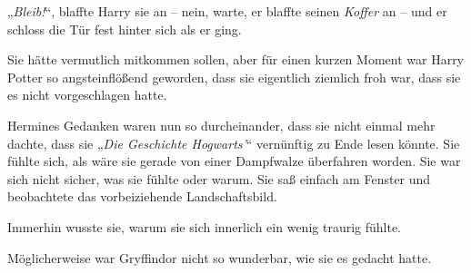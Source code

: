 „\emph{Bleib!}“, blaffte Harry sie an – nein, warte, er blaffte seinen \emph{Koffer} an – und er schloss die Tür fest hinter sich als er ging.

Sie hätte vermutlich mitkommen sollen, aber für einen kurzen Moment war Harry Potter so angsteinflößend geworden, dass sie eigentlich ziemlich froh war, dass sie es nicht vorgeschlagen hatte.

Hermines Gedanken waren nun so durcheinander, dass sie nicht einmal mehr dachte, dass sie „\emph{Die Geschichte Hogwarts’}“ vernünftig zu Ende lesen könnte. Sie fühlte sich, als wäre sie gerade von einer Dampfwalze überfahren worden. Sie war sich nicht sicher, was sie fühlte oder warum. Sie saß einfach am Fenster und beobachtete das vorbeiziehende Landschaftsbild.

Immerhin wusste sie, warum sie sich innerlich ein wenig traurig fühlte.

Möglicherweise war Gryffindor nicht so wunderbar, wie sie es gedacht hatte.

